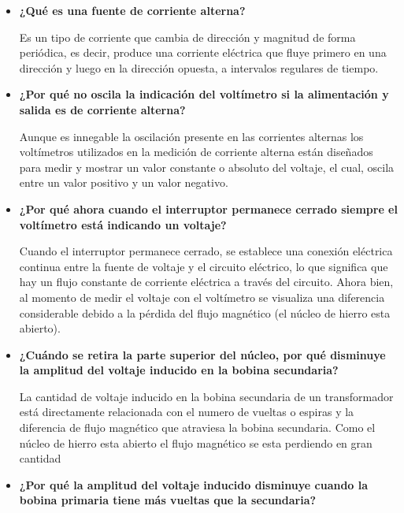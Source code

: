 \documentclass[letterpaper, 12pt]{report}
\begin{document}
\begin{itemize}[label=$\bullet$]
      \item \textbf{¿Qué es una fuente de corriente alterna?}

            Es un tipo de corriente que cambia de dirección y magnitud
            de forma periódica, es decir, produce una corriente
            eléctrica que fluye primero en una dirección y luego en la
            dirección opuesta, a intervalos regulares de tiempo.

      \item \textbf{¿Por qué no oscila la indicación del voltímetro si la alimentación y salida es de
                  corriente alterna?}

            Aunque es innegable la oscilación presente en las
            corrientes alternas los voltímetros utilizados en la
            medición de corriente alterna están diseñados para medir y
            mostrar un valor constante o absoluto del voltaje, el cual,
            oscila entre un valor positivo y un valor negativo.

      \item \textbf{¿Por qué ahora cuando el interruptor permanece cerrado siempre el voltímetro está
                  indicando un voltaje?}

            Cuando el interruptor permanece cerrado, se establece una
            conexión eléctrica continua entre la fuente de voltaje y el
            circuito eléctrico, lo que significa que hay un flujo
            constante de corriente eléctrica a través del circuito.
            Ahora bien, al momento de medir el voltaje con el
            voltímetro se visualiza una diferencia considerable debido
            a la pérdida del flujo magnético (el núcleo de hierro esta
            abierto).

      \item \textbf{¿Cuándo se retira la parte superior del núcleo, por qué disminuye la amplitud del
                  voltaje inducido en la bobina secundaria?}

            La cantidad de voltaje inducido en la bobina secundaria de
            un transformador está directamente relacionada con el
            numero de vueltas o espiras y la diferencia de flujo
            magnético que atraviesa la bobina secundaria. Como el
            núcleo de hierro esta abierto el flujo magnético se esta
            perdiendo en gran cantidad

      \item \textbf{¿Por qué la amplitud del voltaje inducido disminuye cuando la bobina primaria tiene
                  más vueltas que la secundaria?}


\end{itemize}
\end{document}
